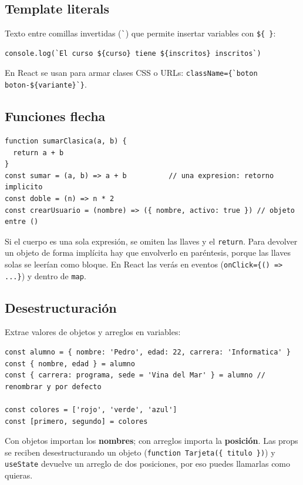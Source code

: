 \documentclass[11pt,a4paper]{article}
\newcommand{\cmd}[1]{\texttt{\color{reactdark}#1}}
\begin{document}
\subsection{Template literals}

Texto entre comillas invertidas (\verb|`|) que permite insertar variables con \verb|${ }|:
\begin{lstlisting}[language=JSX]
console.log(`El curso ${curso} tiene ${inscritos} inscritos`)
\end{lstlisting}

En React se usan para armar clases CSS o URLs: \verb|className={`boton boton-${variante}`}|.

\subsection{Funciones flecha}

\begin{lstlisting}[language=JSX]
function sumarClasica(a, b) {
  return a + b
}
const sumar = (a, b) => a + b          // una expresion: retorno implicito
const doble = (n) => n * 2
const crearUsuario = (nombre) => ({ nombre, activo: true }) // objeto entre ()
\end{lstlisting}

Si el cuerpo es una sola expresión, se omiten las llaves y el \cmd{return}. Para devolver un objeto de forma implícita hay que envolverlo en paréntesis, porque las llaves solas se leerían como bloque. En React las verás en eventos (\cmd{onClick=\{() => ...\}}) y dentro de \cmd{map}.

\subsection{Desestructuración}

Extrae valores de objetos y arreglos en variables:
\begin{lstlisting}[language=JSX]
const alumno = { nombre: 'Pedro', edad: 22, carrera: 'Informatica' }
const { nombre, edad } = alumno
const { carrera: programa, sede = 'Vina del Mar' } = alumno // renombrar y por defecto

const colores = ['rojo', 'verde', 'azul']
const [primero, segundo] = colores
\end{lstlisting}

Con objetos importan los \textbf{nombres}; con arreglos importa la \textbf{posición}. Las props se reciben desestructurando un objeto (\cmd{function Tarjeta(\{ titulo \})}) y \cmd{useState} devuelve un arreglo de dos posiciones, por eso puedes llamarlas como quieras.
\end{document}
